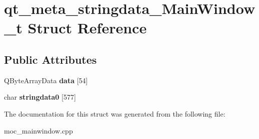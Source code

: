 \hypertarget{structqt__meta__stringdata___main_window__t}{}\section{qt\+\_\+meta\+\_\+stringdata\+\_\+\+Main\+Window\+\_\+t Struct Reference}
\label{structqt__meta__stringdata___main_window__t}
\subsection*{Public Attributes}
\begin{DoxyCompactItemize}
\item 
\hypertarget{structqt__meta__stringdata___main_window__t_a941524227fa9b5bb71719febe2fb3895}{}Q\+Byte\+Array\+Data {\bfseries data} \mbox{[}54\mbox{]}\label{structqt__meta__stringdata___main_window__t_a941524227fa9b5bb71719febe2fb3895}

\item 
\hypertarget{structqt__meta__stringdata___main_window__t_a90b764002a8589a8ae9bec63ad953ec9}{}char {\bfseries stringdata0} \mbox{[}577\mbox{]}\label{structqt__meta__stringdata___main_window__t_a90b764002a8589a8ae9bec63ad953ec9}

\end{DoxyCompactItemize}


The documentation for this struct was generated from the following file\+:\begin{DoxyCompactItemize}
\item 
moc\+\_\+mainwindow.\+cpp\end{DoxyCompactItemize}
